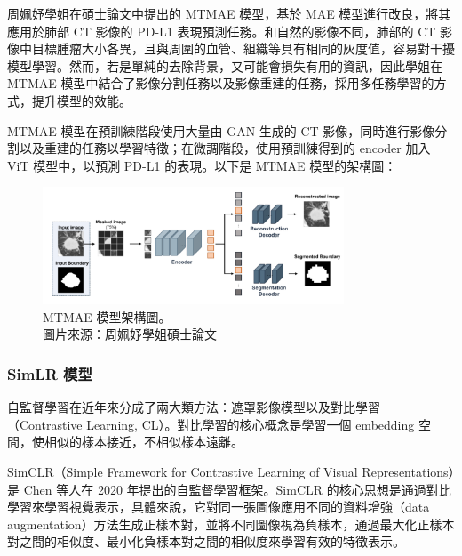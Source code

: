 \documentclass[12pt,a4paper]{article}
\begin{document}
周姵妤學姐在碩士論文中提出的 MTMAE 模型，基於 MAE 模型進行改良，將其應用於肺部 CT 影像的 PD-L1 表現預測任務。和自然的影像不同，肺部的 CT 影像中目標腫瘤大小各異，且與周圍的血管、組織等具有相同的灰度值，容易對干擾模型學習。然而，若是單純的去除背景，又可能會損失有用的資訊，因此學姐在 MTMAE 模型中結合了影像分割任務以及影像重建的任務，採用多任務學習的方式，提升模型的效能。

MTMAE 模型在預訓練階段使用大量由 GAN 生成的 CT 影像，同時進行影像分割以及重建的任務以學習特徵；在微調階段，使用預訓練得到的 encoder 加入 ViT 模型中，以預測 PD-L1 的表現。以下是 MTMAE 模型的架構圖：

\begin{figure}[H]
  \centering
  \includegraphics[width=0.8\textwidth]{src/MTMAE.png}
  \centering
  \caption{MTMAE 模型架構圖。\\圖片來源：周姵妤學姐碩士論文}
  \label{fig:MTMAE-architecture}
\end{figure}

\subsubsection{SimLR 模型}
自監督學習在近年來分成了兩大類方法：遮罩影像模型以及對比學習（Contrastive Learning, CL）。對比學習的核心概念是學習一個 embedding 空間，使相似的樣本接近，不相似樣本遠離。

SimCLR（Simple Framework for Contrastive Learning of Visual Representations）是 Chen 等人在 2020 年提出的自監督學習框架。SimCLR 的核心思想是通過對比學習來學習視覺表示，具體來說，它對同一張圖像應用不同的資料增強（data augmentation）方法生成正樣本對，並將不同圖像視為負樣本，通過最大化正樣本對之間的相似度、最小化負樣本對之間的相似度來學習有效的特徵表示。
\end{document}

